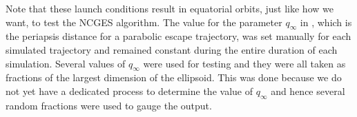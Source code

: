 Note that these launch conditions result in equatorial orbits, just like how we want, to test the \gls{NCGES} algorithm. The value for the parameter $q_\infty$ in , which is the periapsis distance for a parabolic escape trajectory, was set manually for each simulated trajectory and remained constant during the entire duration of each simulation. Several values of $q_\infty$ were used for testing and they were all taken as fractions of the largest dimension of the ellipsoid. This was done because we do not yet have a dedicated process to determine the value of $q_\infty$ and hence several random fractions were used to gauge the output.
